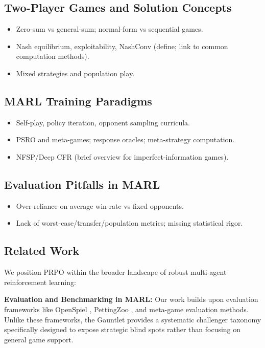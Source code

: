 \documentclass[sigconf,anonymous]{aamas}
\begin{document}
\subsection{Two-Player Games and Solution Concepts}
\begin{itemize}
\item Zero-sum vs general-sum; normal-form vs sequential games.
\item Nash equilibrium, exploitability, NashConv (define; link to common computation methods).
\item Mixed strategies and population play.
\end{itemize}

\subsection{MARL Training Paradigms}
\begin{itemize}
\item Self-play, policy iteration, opponent sampling curricula.
\item PSRO and meta-games; response oracles; meta-strategy computation.
\item NFSP/Deep CFR (brief overview for imperfect-information games).
\end{itemize}

\subsection{Evaluation Pitfalls in MARL}
\begin{itemize}
\item Over-reliance on average win-rate vs fixed opponents.
\item Lack of worst-case/transfer/population metrics; missing statistical rigor.
\end{itemize}

\subsection{Related Work}
We position PRPO within the broader landscape of robust multi-agent reinforcement learning:

\textbf{Evaluation and Benchmarking in MARL:} Our work builds upon evaluation frameworks like OpenSpiel \cite{Lanctot2019OpenSpielOS}, PettingZoo \cite{Terry2020PettingZoo}, and meta-game evaluation methods. Unlike these frameworks, the Gauntlet provides a systematic challenger taxonomy specifically designed to expose strategic blind spots rather than focusing on general game support.
\end{document}
